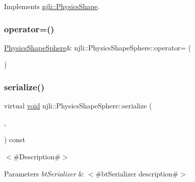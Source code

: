 Implements \mbox{\hyperlink{classnjli_1_1_physics_shape_a890d915f88af06dcf1ac1fa4f5943dc2}{njli\+::\+Physics\+Shape}}.

\mbox{\label{classnjli_1_1_physics_shape_sphere_af3ff5bdb2cbd09f32eb3158a4eb04c56}} 
\subsubsection{\texorpdfstring{operator=()}{operator=()}}
{\footnotesize\ttfamily \mbox{\hyperlink{classnjli_1_1_physics_shape_sphere}{Physics\+Shape\+Sphere}}\& njli\+::\+Physics\+Shape\+Sphere\+::operator= (\begin{DoxyParamCaption}\item[{const \mbox{\hyperlink{classnjli_1_1_physics_shape_sphere}{Physics\+Shape\+Sphere}} \&}]{ }\end{DoxyParamCaption})\hspace{0.3cm}{\ttfamily [protected]}}

\mbox{\label{classnjli_1_1_physics_shape_sphere_a945c46bbfca818c8c9570124896cc8dc}} 
\subsubsection{\texorpdfstring{serialize()}{serialize()}}
{\footnotesize\ttfamily virtual \mbox{\hyperlink{_thread_8h_af1e856da2e658414cb2456cb6f7ebc66}{void}} njli\+::\+Physics\+Shape\+Sphere\+::serialize (\begin{DoxyParamCaption}\item[{\mbox{\hyperlink{_thread_8h_af1e856da2e658414cb2456cb6f7ebc66}{void}} $\ast$}]{,  }\item[{bt\+Serializer $\ast$}]{ }\end{DoxyParamCaption}) const\hspace{0.3cm}{\ttfamily [virtual]}}

$<$\#\+Description\#$>$


\begin{DoxyParams}{Parameters}
{\em bt\+Serializer} & $<$\#bt\+Serializer description\#$>$ \\
\hline
\end{DoxyParams}


